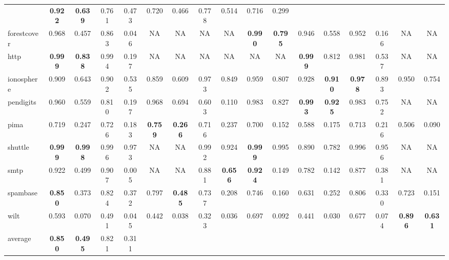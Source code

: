 {\begin{landscape}
\begin{table}[htb]
{\begin{tabular}{lcccccccccccccccc}
            & \textbf{0.922} & \textbf{0.639} & 0.761 & 0.473 & 0.720 & 0.466 &
            0.778 & 0.514     & 0.716 & 0.299 \\
            forestcover  &        0.968 & 0.457 & 0.863 & 0.046 & \acs{NA} &
            \acs{NA} & \acs{NA} & \acs{NA} & \textbf{0.990} & \textbf{0.795} &
            0.946 & 0.558 &  0.952    & 0.166 & \acs{NA} & \acs{NA} \\
            http         &        \textbf{0.999} & \textbf{0.838} & 0.994 &
            0.197 & \acs{NA} & \acs{NA} & \acs{NA} & \acs{NA} & \acs{NA} &
            \acs{NA} & \textbf{0.999} & 0.812 &  0.981    & 0.537     &
            \acs{NA} & \acs{NA} \\
            ionosphere   &        0.909 & 0.643 & 0.902 & 0.535 & 0.859 & 0.609
            & 0.973 & 0.849 & 0.959 & 0.807 & 0.928 & \textbf{0.910} &
            \textbf{0.978} & 0.893     & 0.950 & 0.754 \\
            pendigits    &        0.960 & 0.559 & 0.810 & 0.197 & 0.968 & 0.694
            & 0.603 & 0.110 & 0.983 & 0.827 & \textbf{0.993} & \textbf{0.925} &
            0.983 & 0.752     & \acs{NA} & \acs{NA} \\
            pima         &        0.719 & 0.247 & 0.726 & 0.183 &
            \textbf{0.759} & \textbf{0.266} & 0.716 & 0.237 & 0.700 & 0.152 &
            0.588 & 0.175 &  0.713 & 0.216     & 0.506 & 0.090 \\
            shuttle      &        \textbf{0.999} & \textbf{0.998} & 0.996 &
            0.973 & \acs{NA} & \acs{NA} & 0.992 & 0.924 & \textbf{0.999} &
            0.995 & 0.890 & 0.782 & 0.996    & 0.956     & \acs{NA} & \acs{NA}
            \\ smtp         &        0.922 & 0.499 & 0.907 & 0.005 & \acs{NA} &
            \acs{NA} & 0.881 & \textbf{0.656} & \textbf{0.924} & 0.149 & 0.782
            & 0.142 &  0.877    & 0.381     & \acs{NA} & \acs{NA} \\
            spambase &        \textbf{0.850} & 0.373 & 0.824 & 0.372 & 0.797 &
            \textbf{0.485} & 0.737 & 0.208 & 0.746 & 0.160 & 0.631 & 0.252 &
            0.806 & 0.330     & 0.723 & 0.151 \\
            wilt         &        0.593 & 0.070 & 0.491 & 0.045 & 0.442 & 0.038
            & 0.323 & 0.036 & 0.697 & 0.092 & 0.441 & 0.030 &  0.677    & 0.074
            & \textbf{0.896} & \textbf{0.631} \\
        \cmidrule{1-17}
            average    & \textbf{0.850} & \textbf{0.495} & 0.821 & 0.311 &

\end{tabular}}
\end{table}
\end{landscape}}
